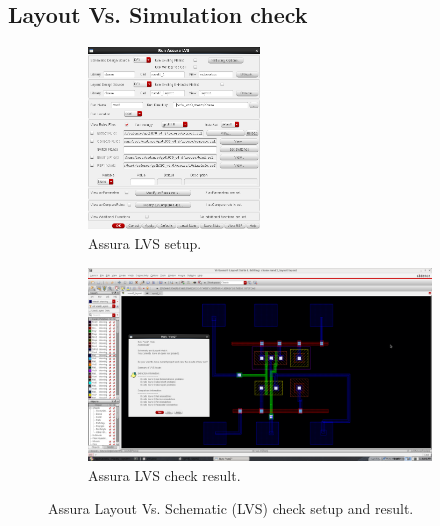 \documentclass[11pt]{article}
\begin{document}
\subsection{Layout Vs. Simulation check}
\begin{figure}[!h]
    \begin{subfigure}[h]{\textwidth}
        \begin{center}
            \includegraphics[width=0.5\textwidth]{lvsSetup}
            \caption{Assura LVS setup.}
        \end{center}
    \end{subfigure}
    \begin{subfigure}[h]{\textwidth}
        \begin{center}
            \includegraphics[width=\textwidth]{LVSoutput}
            \caption{Assura LVS check result.}
        \end{center}
    \end{subfigure}
    \caption{Assura Layout Vs. Schematic (LVS) check setup and result.}
\end{figure}
\newpage
\end{document}
